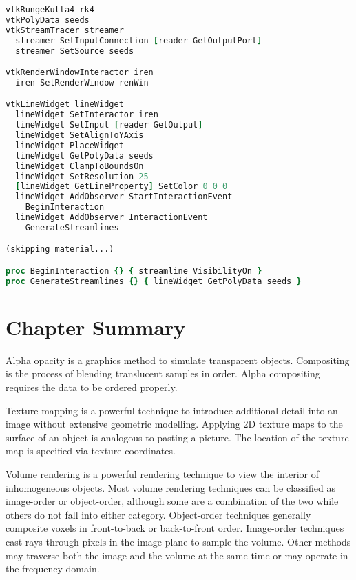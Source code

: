 \clearpage

\begin{lstlisting}[language=TCL, caption={An example of using vtkLineWidget to produce sreamlines.}]
vtkRungeKutta4 rk4
vtkPolyData seeds
vtkStreamTracer streamer
  streamer SetInputConnection [reader GetOutputPort]
  streamer SetSource seeds

vtkRenderWindowInteractor iren
  iren SetRenderWindow renWin

vtkLineWidget lineWidget
  lineWidget SetInteractor iren
  lineWidget SetInput [reader GetOutput]
  lineWidget SetAlignToYAxis
  lineWidget PlaceWidget
  lineWidget GetPolyData seeds
  lineWidget ClampToBoundsOn
  lineWidget SetResolution 25
  [lineWidget GetLineProperty] SetColor 0 0 0
  lineWidget AddObserver StartInteractionEvent
    BeginInteraction
  lineWidget AddObserver InteractionEvent
    GenerateStreamlines

(skipping material...)

proc BeginInteraction {} { streamline VisibilityOn }
proc GenerateStreamlines {} { lineWidget GetPolyData seeds }
\end{lstlisting}


\section{Chapter Summary}

Alpha opacity is a graphics method to simulate transparent objects. Compositing is the process of blending translucent samples in order. Alpha compositing requires the data to be ordered properly.

Texture mapping is a powerful technique to introduce additional detail into an image without extensive geometric modelling. Applying 2D texture maps to the surface of an object is analogous to pasting a picture. The location of the texture map is specified via texture coordinates.

Volume rendering is a powerful rendering technique to view the interior of inhomogeneous objects. Most volume rendering techniques can be classified as image-order or object-order, although some are a combination of the two while others do not fall into either category. Object-order techniques generally composite voxels in front-to-back or back-to-front order. Image-order techniques cast rays through pixels in the image plane to sample the volume. Other methods may traverse both the image and the volume at the same time or may operate in the frequency domain.

